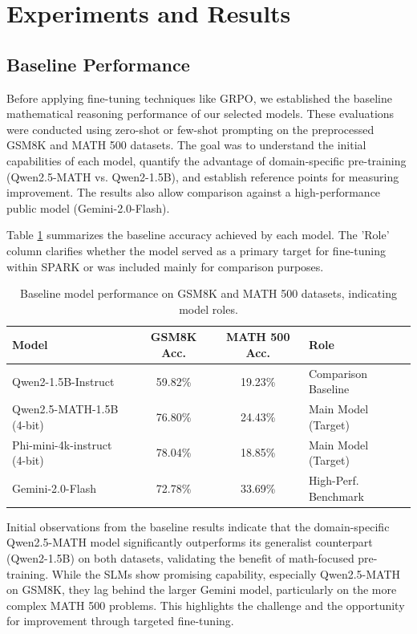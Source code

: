 \documentclass[11pt]{article}
\begin{document}
\section{Experiments and Results}
\subsection{Baseline Performance}
Before applying fine-tuning techniques like GRPO, we established the baseline mathematical reasoning performance of our selected models. These evaluations were conducted using zero-shot or few-shot prompting on the preprocessed GSM8K and MATH 500 datasets. The goal was to understand the initial capabilities of each model, quantify the advantage of domain-specific pre-training (Qwen2.5-MATH vs. Qwen2-1.5B), and establish reference points for measuring improvement. The results also allow comparison against a high-performance public model (Gemini-2.0-Flash).

Table \ref{tab:baseline_performance} summarizes the baseline accuracy achieved by each model. The 'Role' column clarifies whether the model served as a primary target for fine-tuning within SPARK or was included mainly for comparison purposes.

\begin{table}[htbp] %
\centering
\caption{Baseline model performance on GSM8K and MATH 500 datasets, indicating model roles.}
\label{tab:baseline_performance}
\begin{tabular}{@{}l c c l@{}} %
\toprule
\textbf{Model} & \textbf{GSM8K Acc.} & \textbf{MATH 500 Acc.} & \textbf{Role} \\
\midrule
Qwen2-1.5B-Instruct & 59.82\% & 19.23\% & Comparison Baseline \\
Qwen2.5-MATH-1.5B (4-bit) & 76.80\% & 24.43\% & Main Model (Target) \\
Phi-mini-4k-instruct (4-bit) & 78.04\% & 18.85\% & Main Model (Target) \\ %
Gemini-2.0-Flash & 72.78\% & 33.69\% & High-Perf. Benchmark \\
\bottomrule
\end{tabular}
\end{table}

Initial observations from the baseline results indicate that the domain-specific Qwen2.5-MATH model significantly outperforms its generalist counterpart (Qwen2-1.5B) on both datasets, validating the benefit of math-focused pre-training. While the SLMs show promising capability, especially Qwen2.5-MATH on GSM8K, they lag behind the larger Gemini model, particularly on the more complex MATH 500 problems. This highlights the challenge and the opportunity for improvement through targeted fine-tuning.
\end{document}
